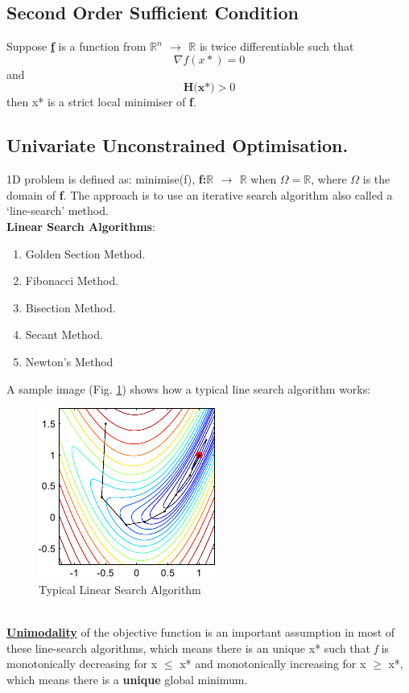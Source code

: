 \documentclass[12pt,a4paper,titlepage]{article}
\begin{document}
\subsection{Second Order Sufficient Condition}
Suppose \textbf{\underline{f}} is a function from \textbf{$\mathbb{R}^n$ $\rightarrow$ $\mathbb{R}$} is twice differentiable such that 
\begin{equation}
    \nabla f(x*)=0    
\end{equation}
and
\begin{equation}
    \textbf{H(x*)} > 0
\end{equation}
then x* is a strict local minimiser of \textbf{f}.

\subsection{Univariate Unconstrained Optimisation.}
1D problem is defined as:
minimise(f), \textbf{f:$\mathbb{R}$ $\rightarrow$ $\mathbb{R}$} when $\Omega = \mathbb{R}$, where $\Omega$ is the domain of \textbf{f}.
The approach is to use an iterative search algorithm also called a `line-search' method. \\
\textbf{Linear Search Algorithms}: 
\begin{enumerate}
    \item Golden Section Method.
    \item Fibonacci Method.
    \item Bisection Method.
    \item Secant Method.
    \item Newton's Method
\end{enumerate}

A sample image (Fig. \ref{fig1}) shows how a typical line search algorithm works: 
\begin{figure}[h!tb]
	\centering
	\includegraphics[scale=1]{line_searchdemo.png}
	\caption{Typical Linear Search Algorithm} \label{fig1}
\end{figure}
\\
\textbf{\underline{Unimodality}} of the objective function is an important assumption in most of these line-search algorithms, which means there is an unique x* such that \emph{f} is monotonically decreasing for x $\leq$ x* and monotonically increasing for x $\geq$ x*, which means there is a \textbf{unique} global minimum.
\end{document}
